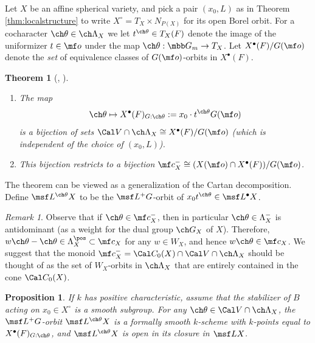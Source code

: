 \documentclass[final]{amsart}
\newtheorem{thm}[subsubsection]{Theorem}
\newtheorem{prop}[subsubsection]{Proposition}
\theoremstyle{remark}
\newtheorem{rem}[subsubsection]{Remark}
\theoremstyle{definition}
\numberwithin{equation}{section}
\begin{document}
Let $X$ be an affine spherical variety, and pick a pair $(x_0, L)$ as in Theorem \ref{thm:localstructure} to write $X^\circ= T_X \times N_{P(X)}$ for its open Borel orbit. 
For a cocharacter $\ch\theta\in \ch\Lambda_X$ we let $t^{\ch\theta} \in T_X(F)$ 
denote the image of the uniformizer $t\in \mf o$ under the map $\ch\theta: \mbb G_m \to T_X$. 
Let $X^\bullet (F)/ G(\mf o)$ denote the \emph{set} of equivalence
classes of $G(\mf o)$-orbits in $X^\bullet (F)$.

\begin{thm}[{\cite{LV}, \cite[Theorem 3.3.1]{GN}}] \label{thm:Gorbits}
\begin{enumerate} 
\item The map 
\begin{equation}
 \ch\theta \mapsto 
X^\bullet(F)_{G:\ch\theta} := x_0 \cdot t^{\ch\theta} G(\mf o) 
\end{equation}
is a bijection of sets $\Cal V \cap \ch\Lambda_X \cong X^\bullet(F)/ G(\mf o)$ (which is independent of the choice of $(x_0,L)$). 
\item This bijection restricts to a bijection $\mf c_X^- 
\cong (X(\mf o)\cap X^\bullet(F))/ G(\mf o)$.
\end{enumerate}
\end{thm}

The theorem can be viewed as a generalization of the Cartan decomposition.
Define $\msf L^{\ch\theta} X$ to be the $\msf L^+G$-orbit of $x_0 t^{\ch\theta} \in \msf L^\bullet X$.



\begin{rem} \label{rem:C0V}
Observe that if $\ch\theta\in \mf c_X^-$, then 
in particular $\ch\theta\in \Lambda^-_X$ is antidominant (as a weight for the dual group $\ch G_X$ of $X$). 
Therefore, $w\ch\theta- \ch\theta\in \Lambda^\pos_X \subset \mf c_X$ for any $w\in W_X$, and hence $w\ch\theta\in \mf c_X$.
We suggest that the monoid $\mf c_X^- = \Cal C_0(X) \cap \Cal V \cap \ch\Lambda_X$ should be
thought of as the set of $W_X$-orbits in $\ch\Lambda_X$ that are entirely
contained in the cone $\Cal C_0(X)$.
\end{rem}


\begin{prop} \label{prop:smoothfiberstrata}
If $k$ has positive characteristic, 
assume that the stabilizer of $B$ acting on $x_0 \in X^\circ$ is a smooth subgroup. 
For any $\ch\theta \in \Cal V \cap \ch\Lambda_X$, 
the $\msf L^+G$-orbit $\msf L^{\ch\theta} X$ is a formally smooth $k$-scheme
with $k$-points equal to $X^\bullet(F)_{G:\ch\theta}$, and 
$\msf L^{\ch\theta} X$ is open in its closure in $\msf L X$. 
\end{prop}
\end{document}
